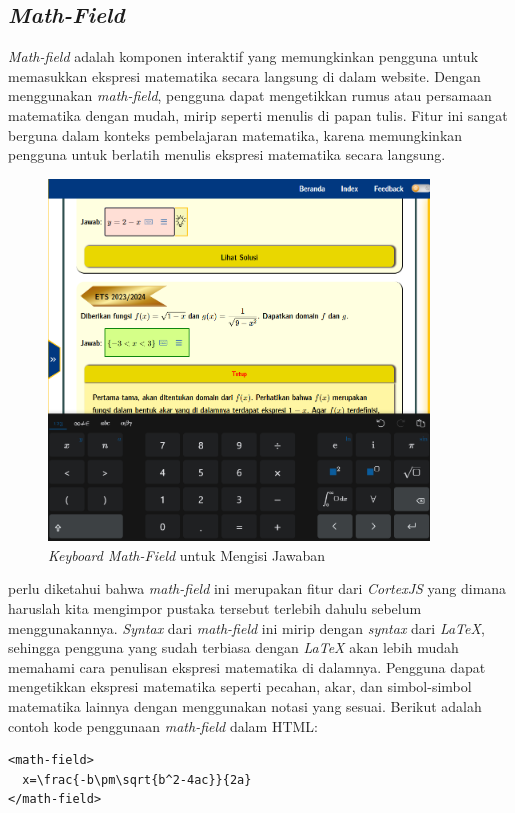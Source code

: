 \documentclass{file/KP-ITS}
\theoremstyle{definition}
\theoremstyle{definition}
\theoremstyle{plain}
\begin{document}
\subsection{\textit{Math-Field}}
\textit{Math-field} adalah komponen interaktif yang memungkinkan pengguna untuk memasukkan ekspresi matematika secara langsung di dalam website. Dengan menggunakan \textit{math-field}, pengguna dapat mengetikkan rumus atau persamaan matematika dengan mudah, mirip seperti menulis di papan tulis. Fitur ini sangat berguna dalam konteks pembelajaran matematika, karena memungkinkan pengguna untuk berlatih menulis ekspresi matematika secara langsung.
\begin{figure}[h!]
  \centering
  \includegraphics[width=0.9\textwidth]{foto/IsiJawaban.png}
  \caption{\textit{Keyboard Math-Field} untuk Mengisi Jawaban}
\end{figure}
perlu diketahui bahwa \textit{math-field} ini merupakan fitur dari \textit{CortexJS} yang dimana haruslah kita mengimpor pustaka tersebut terlebih dahulu sebelum menggunakannya. \textit{Syntax} dari \textit{math-field} ini mirip dengan \textit{syntax} dari \textit{LaTeX}, sehingga pengguna yang sudah terbiasa dengan \textit{LaTeX} akan lebih mudah memahami cara penulisan ekspresi matematika di dalamnya. Pengguna dapat mengetikkan ekspresi matematika seperti pecahan, akar, dan simbol-simbol matematika lainnya dengan menggunakan notasi yang sesuai.
Berikut adalah contoh kode penggunaan \textit{math-field} dalam HTML:
\begin{verbatim}
<math-field>
  x=\frac{-b\pm\sqrt{b^2-4ac}}{2a}
</math-field>
\end{verbatim}
\end{document}

